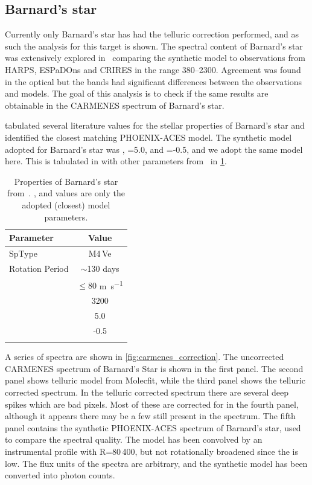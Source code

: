 \subsection{Barnard's star}
\label{sec:carmenes_barnards_star}
Currently only Barnard's star has had the telluric correction performed, and as such the analysis for this target is shown.
The spectral content of Barnard's star was extensively explored in~\citet{artigau_optical_2018} comparing the synthetic model to observations from {HARPS}, {ESPaDOns} and {CRIRES} in the range 380--2300\nm{}.
Agreement was found in the optical but the \nir{} bands had significant differences between the observations and models. 
The goal of this analysis is to check if the same results are obtainable in the {CARMENES} spectrum of Barnard's star.

\citet{artigau_optical_2018} tabulated several literature values for the stellar properties of Barnard's star and identified the closest matching {PHOENIX-ACES} model.
The synthetic model adopted for Barnard's star was \K{}, \Logg{}=5.0, and \feh{}=-0.5, and we adopt the same model here.
This is tabulated in with other parameters from~\citet{artigau_optical_2018} in \cref{tab:barnards_star_params}.

\begin{table}
    \centering
    \caption[Properties of Barnard's star.]{Properties of Barnard's star from~\citet{artigau_optical_2018}. \Teff{}, \feh{} and \Logg{} values are only the adopted (closest) model parameters.}
    \begin{tabular}{lc}
        \toprule
        Parameter & Value \\
        \midrule
        SpType & M4\,Ve \\
        Rotation Period & \(\sim\)130 days \\
        \Vsini{} & \(\le 80\) \si{\metre\per\second} \\
        \Teff{} & 3200 \K{} \\
        \Logg{} & 5.0 \\
        \feh{} & -0.5 \\
        \bottomrule{}
    \end{tabular}\label{tab:barnards_star_params}
\end{table}

A series of spectra are shown in \cref{fig:carmenes_correction}.
The uncorrected {CARMENES} spectrum of Barnard's Star is shown in the first panel.
The second panel shows telluric model from Molecfit, while the third panel shows the telluric corrected spectrum.
In the telluric corrected spectrum there are several deep spikes which are bad pixels.
Most of these are corrected for in the fourth panel, although it appears there may be a few still present in the spectrum.
The fifth panel contains the synthetic PHOENIX-ACES spectrum of Barnard's star, used to compare the spectral quality.
The model has been convolved by an instrumental profile with R=80\,400, but not rotationally broadened since the \Vsini{} is low. The flux units of the spectra are arbitrary, and the synthetic model has been converted into photon counts.

